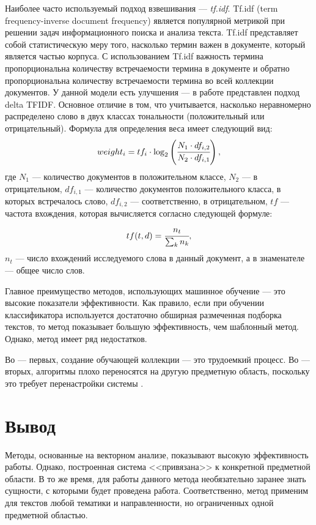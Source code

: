 Наиболее часто используемый подход взвешивания --- \textit{tf.idf}\cite{tf}. Tf.idf (term frequency-inverse document frequency) является популярной метрикой при решении задач информационного поиска и анализа текста. Tf.idf представляет собой статистическую меру того, насколько термин важен в документе, который является частью корпуса. С использованием Tf.idf важность термина пропорциональна количеству встречаемости термина в документе и обратно пропорциональна количеству встречаемости термина во всей
коллекции документов.
У данной модели есть улучшения --- в работе \cite{delta} представлен подход delta TFIDF. Основное отличие в том, что учитывается, насколько неравномерно распределено слово в двух классах тональности (положительный или отрицательный). Формула для определения веса имеет следующий вид: 
\begin{equation}
	weight_i = tf_i \cdot \log_2\left(\cfrac{N_1 \cdot df_{i, 2}}{N_2 \cdot df_{i, 1}}\right),
\end{equation} 
где $N_1$ --- количество документов в положительном классе, $N_2$ --- в отрицательном, $df_{i, 1}$ --- количество документов положительного класса, в которых встречалось слово, $df_{i, 2}$ --- соответственно, в отрицательном, $tf$ --- частота вхождения, которая вычисляется согласно следующей формуле:
\begin{equation}
	tf(t, d) = \cfrac{n_t}{\sum_{k}n_k},
\end{equation}
$n_t$ --- число вхождений исследуемого слова в данный документ, а в знаменателе --- общее число слов.

Главное преимущество методов, использующих машинное обучение --- это высокие показатели эффективности. Как правило, если при обучении классификатора используется достаточно обширная размеченная подборка текстов, то метод показывает большую эффективность, чем шаблонный метод. Однако, метод имеет ряд недостатков. 

Во --- первых, создание обучающей коллекции --- это трудоемкий процесс. Во --- вторых, алгоритмы плохо переносятся на другую предметную область, поскольку это требует перенастройки системы \cite{rework}. 
\section{Вывод}
Методы, основанные на векторном анализе, показывают высокую эффективность работы. Однако, построенная система <<привязана>> к конкретной предметной области. В то же время, для работы данного метода необязательно заранее знать сущности, с которыми будет проведена работа. Соответственно, метод применим для текстов любой тематики и направленности, но ограниченных одной предметной областью.
